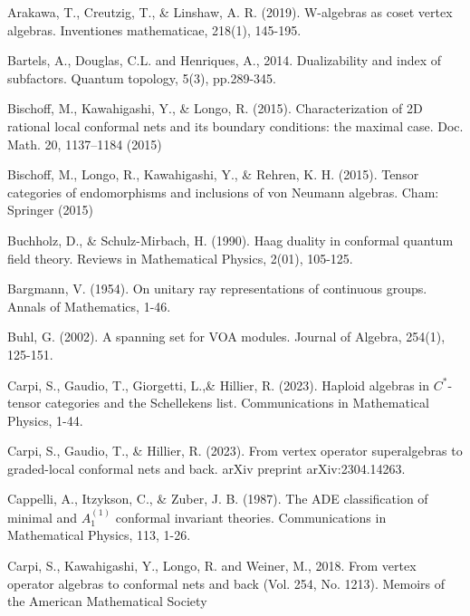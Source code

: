 \documentclass[11pt,b5paper,notitlepage]{article}
\theoremstyle{definition}
\theoremstyle{plain}
\numberwithin{equation}{section}
\begin{document}
	\begin{thebibliography}{999999}
		\footnotesize	


Arakawa, T., Creutzig, T., \& Linshaw, A. R. (2019). W-algebras as coset vertex algebras. Inventiones mathematicae, 218(1), 145-195.


Bartels, A., Douglas, C.L. and Henriques, A., 2014. Dualizability and index of subfactors. Quantum topology, 5(3), pp.289-345.

Bischoff, M., Kawahigashi, Y., \& Longo, R. (2015). Characterization of 2D rational local conformal nets and its boundary conditions: the maximal case. Doc. Math. 20, 1137--1184 (2015)

Bischoff, M., Longo, R., Kawahigashi, Y., \& Rehren, K. H. (2015). Tensor categories of endomorphisms and inclusions of von Neumann algebras. Cham: Springer (2015)

Buchholz, D., \& Schulz-Mirbach, H. (1990). Haag duality in conformal quantum field theory. Reviews in Mathematical Physics, 2(01), 105-125.

Bargmann, V. (1954). On unitary ray representations of continuous groups. Annals of Mathematics, 1-46.

Buhl, G. (2002). A spanning set for VOA modules. Journal of Algebra, 254(1), 125-151.

Carpi, S., Gaudio, T., Giorgetti, L.,\& Hillier, R. (2023). Haploid algebras in $C^*$-tensor categories and the Schellekens list. Communications in Mathematical Physics, 1-44.

Carpi, S., Gaudio, T., \& Hillier, R. (2023). From vertex operator superalgebras to graded-local conformal nets and back. arXiv preprint arXiv:2304.14263.

Cappelli, A., Itzykson, C., \& Zuber, J. B. (1987). The ADE classification of minimal and $A_1^{(1)}$ conformal invariant theories. Communications in Mathematical Physics, 113, 1-26.

Carpi, S., Kawahigashi, Y., Longo, R. and Weiner, M., 2018. From vertex operator algebras to conformal nets and back (Vol. 254, No. 1213). Memoirs of the American Mathematical Society


\end{thebibliography}
\end{document}
